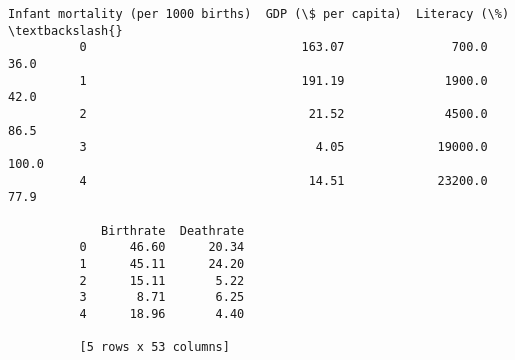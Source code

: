 \documentclass[11pt]{article}
\begin{document}
\begin{Verbatim}[commandchars=\\\{\}]
             Infant mortality (per 1000 births)  GDP (\$ per capita)  Literacy (\%)  \textbackslash{}
          0                              163.07               700.0          36.0   
          1                              191.19              1900.0          42.0   
          2                               21.52              4500.0          86.5   
          3                                4.05             19000.0         100.0   
          4                               14.51             23200.0          77.9   
          
             Birthrate  Deathrate  
          0      46.60      20.34  
          1      45.11      24.20  
          2      15.11       5.22  
          3       8.71       6.25  
          4      18.96       4.40  
          
          [5 rows x 53 columns]
\end{Verbatim}
            

    
    
    
    
\end{document}
